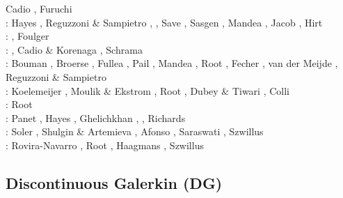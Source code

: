 \begin{scriptsize}
                    Cadio \etal \cite{capd11}, Furuchi \cite{furu11}\\
\twothousandtwelve: Hayes \etal \cite{hawj12}, Reguzzoni \& Sampietro \cite{resa12},
                    \cite{fesw12}\cite{simj12}\cite{beck12}\cite{pahk12}, 
                    Save \etal \cite{sabt12}, Sasgen \etal \cite{sakm12}, 
                    Mandea \etal \cite{mapl12}, Jacob \etal \cite{jawp12},
                    Hirt \etal \cite{hick12}\\
\twothousandthirteen: \cite{ress13}\cite{ebbf13}\cite{davi13}\cite{scle13}\cite{waja13}, 
                      Foulger \etal \cite{fopa13}\\
\twothousandfourteen: \cite{paml14}\cite{ebbf14}\cite{krbk14}\cite{licl14}\cite{aubb14}, 
                      Cadio \& Korenaga \cite{cako14}, Schrama \etal \cite{scwr14}\\
\twothousandfifteen: Bouman \etal \cite{boem15}, Broerse \etal \cite{brrs15}, 
                     Fullea \etal \cite{furc15}, Pail \etal \cite{pabb15},
                     Mandea \etal \cite{manp15}, Root \etal \cite{rotv15},
                     Fecher \etal \cite{fepg15}, van der Meijde \etal \cite{vapb15},
                     Reguzzoni \& Sampietro \cite{resa15}\\
\twothousandsixteen: Koelemeijer \etal \cite{kord16}, Moulik \& Ekstrom \cite{moek16}, 
                     Root \etal \cite{rond16}, 
                     Dubey \& Tiwari \cite{duti16}, Colli \etal \cite{cogb16}\\
\twothousandseventeen: Root \etal \cite{roev17}\\
\twothousandeighteen: Panet \etal \cite{pabn18}, Hayes \etal \cite{hamp18}, 
                      Ghelichkhan \etal \cite{ghmc18}, \cite{homs18}, 
                      Richards \etal \cite{rihc18}\\
\twothousandnineteen: Soler \etal \cite{sopg19}, Shulgin \& Artemieva \cite{shar19}, 
                      Afonso \etal \cite{afss19}, 
                      Saraswati \cite{sacm19}, Szwillus \etal \cite{szae19}\\
\twothousandtwenty: Rovira-Navarro \etal \cite{rovb20}, Root \cite{root20}, 
                    Haagmans \etal \cite{hasm20}, Szwillus \etal \cite{szes20}
\end{scriptsize}

\subsection{Discontinuous Galerkin (DG)}

